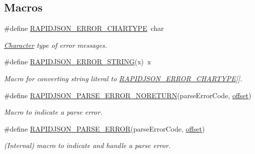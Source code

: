 \subsection*{Macros}
\begin{DoxyCompactItemize}
\item 
\#define \hyperlink{group__RAPIDJSON__ERRORS_ga7e4636fd48d0148f102b8a13f0539d8c}{R\+A\+P\+I\+D\+J\+S\+O\+N\+\_\+\+E\+R\+R\+O\+R\+\_\+\+C\+H\+A\+R\+T\+Y\+PE}~char
\begin{DoxyCompactList}\small\item\em \hyperlink{structCharacter}{Character} type of error messages. \end{DoxyCompactList}\item 
\#define \hyperlink{group__RAPIDJSON__ERRORS_gabe2e1bd1349e5a7d6c1af78c05a98f0d}{R\+A\+P\+I\+D\+J\+S\+O\+N\+\_\+\+E\+R\+R\+O\+R\+\_\+\+S\+T\+R\+I\+NG}(x)~x
\begin{DoxyCompactList}\small\item\em Macro for converting string literal to \hyperlink{group__RAPIDJSON__ERRORS_ga7e4636fd48d0148f102b8a13f0539d8c}{R\+A\+P\+I\+D\+J\+S\+O\+N\+\_\+\+E\+R\+R\+O\+R\+\_\+\+C\+H\+A\+R\+T\+Y\+PE}\mbox{[}\mbox{]}. \end{DoxyCompactList}\item 
\#define \hyperlink{group__RAPIDJSON__ERRORS_ga7f8c4265b2edda78568ae3338aaf1461}{R\+A\+P\+I\+D\+J\+S\+O\+N\+\_\+\+P\+A\+R\+S\+E\+\_\+\+E\+R\+R\+O\+R\+\_\+\+N\+O\+R\+E\+T\+U\+RN}(parse\+Error\+Code,  \hyperlink{imgui__impl__opengl3__loader_8h_ae1b92ae085ddef4b1cdca7d749339fb0}{offset})
\begin{DoxyCompactList}\small\item\em Macro to indicate a parse error. \end{DoxyCompactList}\item 
\#define \hyperlink{group__RAPIDJSON__ERRORS_gae3689840fa6e89a241313f33b602f865}{R\+A\+P\+I\+D\+J\+S\+O\+N\+\_\+\+P\+A\+R\+S\+E\+\_\+\+E\+R\+R\+OR}(parse\+Error\+Code,  \hyperlink{imgui__impl__opengl3__loader_8h_ae1b92ae085ddef4b1cdca7d749339fb0}{offset})
\begin{DoxyCompactList}\small\item\em (Internal) macro to indicate and handle a parse error. \end{DoxyCompactList}\end{DoxyCompactItemize}
